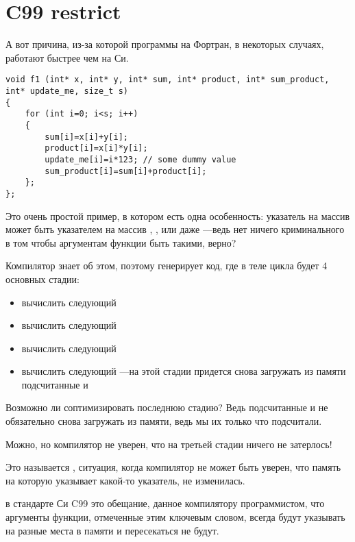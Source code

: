 \section{C99 restrict}

А вот причина, из-за которой программы на Фортран, в некоторых случаях, работают быстрее чем на Си.

\begin{lstlisting}
void f1 (int* x, int* y, int* sum, int* product, int* sum_product, int* update_me, size_t s)
{
	for (int i=0; i<s; i++)
	{
		sum[i]=x[i]+y[i];
		product[i]=x[i]*y[i];
		update_me[i]=i*123; // some dummy value
		sum_product[i]=sum[i]+product[i];	
	};
};
\end{lstlisting}

Это очень простой пример, в котором есть одна особенность: 
указатель на массив  может быть указателем на массив
, , или даже 
---ведь нет ничего криминального в том 
чтобы аргументам функции быть такими, верно?

Компилятор знает об этом, поэтому генерирует код, где в теле цикла будет 4 основных стадии:

\begin{itemize}
\item вычислить следующий 
\item вычислить следующий 
\item вычислить следующий 
\item вычислить следующий ---на этой стадии придется снова загружать из памяти подсчитанные
  и 
\end{itemize}

Возможно ли соптимизировать последнюю стадию?
Ведь подсчитанные  и  
не обязательно снова загружать из памяти, ведь мы их только что подсчитали.

Можно, но компилятор не уверен, что на третьей стадии ничего не затерлось!

Это называется
, ситуация, когда компилятор не может быть уверен, что память на которую указывает 
какой-то указатель, не изменилась.

 в стандарте Си C99 
это обещание, данное компилятору программистом, что аргументы функции, отмеченные этим ключевым словом,
всегда будут указывать на разные места в памяти и пересекаться не будут.

